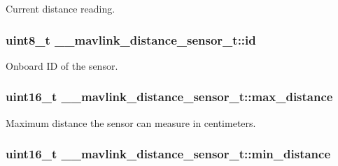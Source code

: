 Current distance reading. 

\hypertarget{struct____mavlink__distance__sensor__t_aa1571c2fd20e829474f6e2f29cd9c753}{
\subsubsection[{id}]{\setlength{\rightskip}{0pt plus 5cm}uint8\+\_\+t \+\_\+\+\_\+mavlink\+\_\+distance\+\_\+sensor\+\_\+t\+::id}}\label{struct____mavlink__distance__sensor__t_aa1571c2fd20e829474f6e2f29cd9c753}


Onboard I\+D of the sensor. 

\hypertarget{struct____mavlink__distance__sensor__t_ad961692c0e76ba99f5239ab5472b1acb}{
\subsubsection[{max\+\_\+distance}]{\setlength{\rightskip}{0pt plus 5cm}uint16\+\_\+t \+\_\+\+\_\+mavlink\+\_\+distance\+\_\+sensor\+\_\+t\+::max\+\_\+distance}}\label{struct____mavlink__distance__sensor__t_ad961692c0e76ba99f5239ab5472b1acb}


Maximum distance the sensor can measure in centimeters. 

\hypertarget{struct____mavlink__distance__sensor__t_a86645b183bc2be28eb6327a205baff2b}{
\subsubsection[{min\+\_\+distance}]{\setlength{\rightskip}{0pt plus 5cm}uint16\+\_\+t \+\_\+\+\_\+mavlink\+\_\+distance\+\_\+sensor\+\_\+t\+::min\+\_\+distance}}\label{struct____mavlink__distance__sensor__t_a86645b183bc2be28eb6327a205baff2b}


